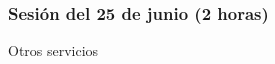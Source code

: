\documentclass[a4paper,12pt]{article}
\begin{document}

\subsubsection{Sesión del 25 de junio (2 horas)}

Otros servicios




\end{document}

